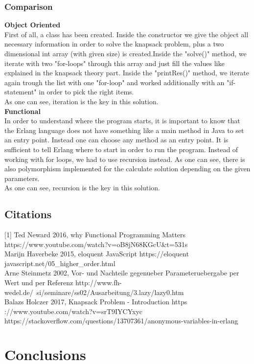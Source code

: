\subsubsection{Comparison}
\textbf{Object Oriented}\\
First of all, a class has been created. Inside the constructor we give the object all necessary information in order to solve the knapsack problem, plus a two dimensional int array (with given size) is created.Inside the "solve()" method, we iterate with two "for-loops" through this array and just fill the values like explained in the knapsack theory part. Inside the "printRes()" method, we iterate again trough the list with one "for-loop" and worked additionally with an "if-statement" in order to pick the right items.\\
As one can see, iteration is the key in this solution.\\
\textbf{Functional}\\
In order to understand where the program starts, it is important to know that the Erlang language does not have something like a main method in Java to set an entry point. Instead one can choose any method as an entry point. It is sufficient to tell Erlang where to start in order to run the program. Instead of working with for loops, we had to use recursion instead. As one can see, there is also polymorphism implemented for the calculate solution depending on the given parameters.\\
As one can see, recursion is the key in this solution.

\subsection{Citations}
[1] Ted Neward 2016, why Functional Programming Matters https://www.youtube.com/watch?v=oB8jN68KGcU&t=531s\\
[2] Marijn Haverbeke 2015, eloquent JavaScript https://eloquent javascript.net/05\_higher\_order.html\\
[3] Arne Steinmetz 2002, Vor- und Nachteile gegenueber Parameteruebergabe per Wert und per Referenz http://www.fh-wedel.de/~si/seminare/ss02/Ausarbeitung/3.lazy/lazy0.htm\\
[4] Balazs Holczer 2017, Knapsack Problem - Introduction https ://www.youtube.com/watch?v=srT9IYCYxyc\\
[5] https://stackoverflow.com/questions/13707361/anonymous-variables-in-erlang \\


\section{Conclusions}
